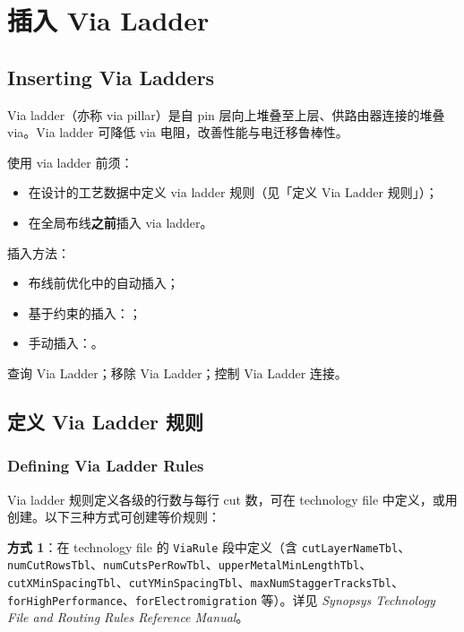 \section{插入 Via Ladder}
\subsection*{Inserting Via Ladders}

Via ladder（亦称 via pillar）是自 pin 层向上堆叠至上层、供路由器连接的堆叠 via。Via ladder 可降低 via 电阻，改善性能与电迁移鲁棒性。

使用 via ladder 前须：
\begin{itemize}
  \item 在设计的工艺数据中定义 via ladder 规则（见「定义 Via Ladder 规则」）；
  \item 在全局布线\textbf{之前}插入 via ladder。
\end{itemize}

插入方法：
\begin{itemize}
  \item 布线前优化中的自动插入；
  \item 基于约束的插入：；
  \item 手动插入：。
\end{itemize}

\begin{seeAlsoBox}
查询 Via Ladder；移除 Via Ladder；控制 Via Ladder 连接。
\end{seeAlsoBox}

\subsection{定义 Via Ladder 规则}
\subsubsection*{Defining Via Ladder Rules}

Via ladder 规则定义各级的行数与每行 cut 数，可在 technology file 中定义，或用  创建。以下三种方式可创建等价规则：

\textbf{方式 1}：在 technology file 的 \texttt{ViaRule} 段中定义（含 \texttt{cutLayerNameTbl}、\texttt{numCutRowsTbl}、\texttt{numCutsPerRowTbl}、\texttt{upperMetalMinLengthTbl}、\texttt{cutXMinSpacingTbl}、\texttt{cutYMinSpacingTbl}、\texttt{maxNumStaggerTracksTbl}、\texttt{forHighPerformance}、\texttt{forElectromigration} 等）。详见 \textit{Synopsys Technology File and Routing Rules Reference Manual}。

